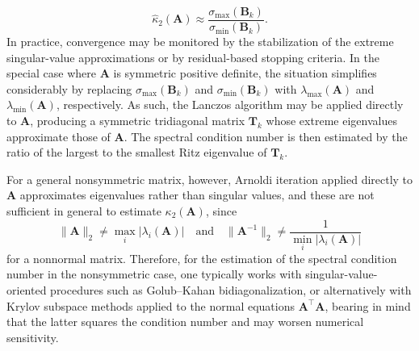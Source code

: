 \documentclass[11pt,a4paper]{article}
\theoremstyle{plain}
\theoremstyle{definition}
\theoremstyle{remark}
\begin{document}
\begin{equation}
\widehat{\kappa}_2(\mathbf{A})
\approx
\frac{\sigma_{\max}(\mathbf{B}_k)}{\sigma_{\min}(\mathbf{B}_k)}.
\end{equation}
In practice, convergence may be monitored by the stabilization of the extreme singular-value approximations or by residual-based stopping criteria. In the special case where $\mathbf{A}$ is symmetric positive definite, the situation simplifies considerably by replacing $\sigma_{\max}(\mathbf{B}_k)$ and $\sigma_{\min}(\mathbf{B}_k)$ with $\lambda_{\max}(\mathbf{A})$ and $\lambda_{\min}(\mathbf{A})$, respectively. As such, the Lanczos algorithm may be applied directly to $\mathbf{A}$, producing a symmetric tridiagonal matrix $\mathbf{T}_k$ whose extreme eigenvalues approximate those of $\mathbf{A}$. The spectral condition number is then estimated by the ratio of the largest to the smallest Ritz eigenvalue of $\mathbf{T}_k$.

For a general nonsymmetric matrix, however, Arnoldi iteration applied directly to $\mathbf{A}$ approximates eigenvalues rather than singular values, and these are not sufficient in general to estimate $\kappa_2(\mathbf{A})$, since
\begin{equation*}
\|\mathbf{A}\|_2 \neq \max_i |\lambda_i(\mathbf{A})|
\quad\text{and}\quad
\|\mathbf{A}^{-1}\|_2 \neq \frac{1}{\min_i |\lambda_i(\mathbf{A})|}
\end{equation*}
for a nonnormal matrix. Therefore, for the estimation of the spectral condition number in the nonsymmetric case, one typically works with singular-value-oriented procedures such as Golub--Kahan bidiagonalization, or alternatively with Krylov subspace methods applied to the normal equations $\mathbf{A}^\top \mathbf{A}$, bearing in mind that the latter squares the condition number and may worsen numerical sensitivity.
\end{document}
